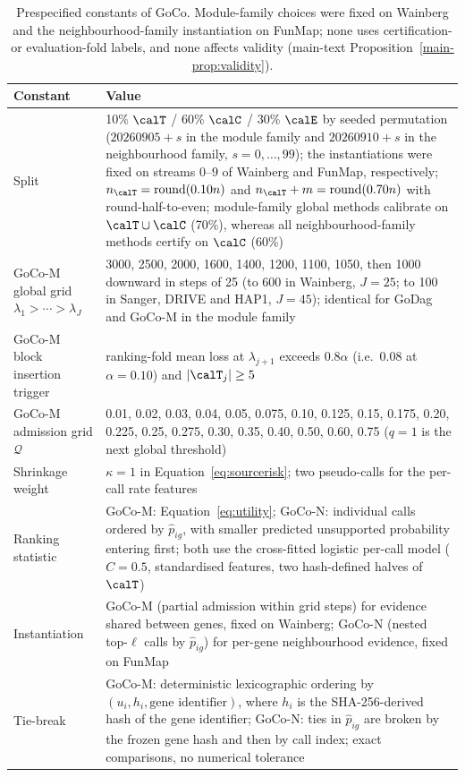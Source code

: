 \begin{table}[!t]
\centering
\caption{Prespecified constants of GoCo. Module-family choices were fixed on Wainberg and the neighbourhood-family instantiation on FunMap; none uses certification- or evaluation-fold labels, and none affects validity (main-text Proposition~\ref{main-prop:validity}).}
\label{tab:constants}
\scriptsize
\begin{tabular}{p{} p{}}
\toprule
Constant & Value \\
\midrule
Split & 10\% $\calT$ / 60\% $\calC$ / 30\% $\calE$ by seeded permutation ($20260905+s$ in the module family and $20260910+s$ in the neighbourhood family, $s=0,\ldots,99$); the instantiations were fixed on streams $0$--$9$ of Wainberg and FunMap, respectively; $n_{\calT}=\operatorname{round}(0.10n)$ and $n_{\calT}+m=\operatorname{round}(0.70n)$ with round-half-to-even; module-family global methods calibrate on $\calT\cup\calC$ (70\%), whereas all neighbourhood-family methods certify on $\calC$ (60\%) \\
GoCo-M global grid $\lambda_1>\cdots>\lambda_J$ & 3000, 2500, 2000, 1600, 1400, 1200, 1100, 1050, then 1000 downward in steps of 25 (to 600 in Wainberg, $J=25$; to 100 in Sanger, DRIVE and HAP1, $J=45$); identical for GoDag and GoCo-M in the module family \\
GoCo-M block insertion trigger & ranking-fold mean loss at $\lambda_{j+1}$ exceeds $0.8\alpha$ (i.e.\ 0.08 at $\alpha=0.10$) and $|\calT_j|\ge5$ \\
GoCo-M admission grid $\mathcal Q$ & 0.01, 0.02, 0.03, 0.04, 0.05, 0.075, 0.10, 0.125, 0.15, 0.175, 0.20, 0.225, 0.25, 0.275, 0.30, 0.35, 0.40, 0.50, 0.60, 0.75 ($q=1$ is the next global threshold) \\
Shrinkage weight & $\kappa=1$ in Equation~\eqref{eq:sourcerisk}; two pseudo-calls for the per-call rate features \\
Ranking statistic & GoCo-M: Equation~\eqref{eq:utility}; GoCo-N: individual calls ordered by $\widehat p_{ig}$, with smaller predicted unsupported probability entering first; both use the cross-fitted logistic per-call model ($C=0.5$, standardised features, two hash-defined halves of $\calT$) \\
Instantiation & GoCo-M (partial admission within grid steps) for evidence shared between genes, fixed on Wainberg; GoCo-N (nested top-$\ell$ calls by $\widehat p_{ig}$) for per-gene neighbourhood evidence, fixed on FunMap \\
Tie-break & GoCo-M: deterministic lexicographic ordering by $(u_i,h_i,\text{gene identifier})$, where $h_i$ is the SHA-256-derived hash of the gene identifier; GoCo-N: ties in $\widehat p_{ig}$ are broken by the frozen gene hash and then by call index; exact comparisons, no numerical tolerance \\

\end{tabular}
\end{table}

